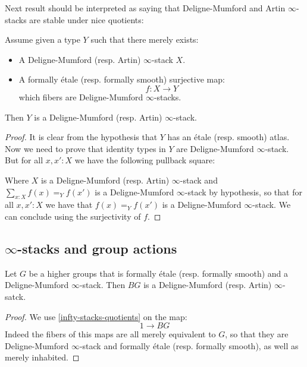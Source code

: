 Next result should be interpreted as saying that Deligne-Mumford and Artin $\infty$-stacks are stable under nice quotients:

\begin{proposition}\label{infty-stacks-quotients}
Assume given a type $Y$ such that there merely exists:
\begin{itemize} 
\item A Deligne-Mumford (resp. Artin) $\infty$-stack $X$.
\item A formally étale (resp. formally smooth) surjective map:
\[f:X\to Y\]
which fibers are Deligne-Mumford $\infty$-stacks. 
\end{itemize}
Then $Y$ is a Deligne-Mumford (resp. Artin) $\infty$-stack.
\end{proposition}

\begin{proof}
It is clear from the hypothesis that $Y$ has an étale (resp. smooth) atlas. Now we need to prove that identity types in $Y$ are Deligne-Mumford $\infty$-stack. But for all $x,x':X$ we have the following pullback square:
 \begin{center}
  \end{center}
  Where $X$ is a Deligne-Mumford (resp. Artin) $\infty$-stack and $\sum_{x:X}f(x)=_Yf(x')$ is a Deligne-Mumford $\infty$-stack by hypothesis, so that for all $x,x':X$ we have that $f(x)=_Yf(x')$ is a Deligne-Mumford $\infty$-stack. We can conclude using the surjectivity of $f$.
\end{proof}

\subsection{$\infty$-stacks and group actions}

\begin{lemma}\label{delooping-stacks}
Let $G$ be a higher groups that is formally étale (resp. formally smooth) and a Deligne-Mumford $\infty$-stack. Then $BG$ is a Deligne-Mumford (resp. Artin) $\infty$-satck.
\end{lemma}

\begin{proof}
We use \cref{infty-stacks-quotients} on the map:
\[1\to BG\]
Indeed the fibers of this maps are all merely equivalent to $G$, so that they are Deligne-Mumford $\infty$-stack and formally étale (resp. formally smooth), as well as merely inhabited.
\end{proof}

